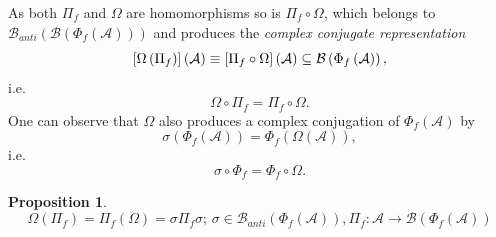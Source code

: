 \documentclass[aps,preprint]{revtex4}
\newtheorem{proposition}[theorem]{Proposition}
\begin{document}
As both $\Pi_{f}$ and $\Omega$ are homomorphisms so is $\Pi_{f}\circ\Omega$,
which belongs to $\mathcal{B}_{anti}\left( \mathcal{B}\left( \Phi_{f}\left( 
\mathcal{A}\right) \right) \right) $ and produces the \emph{complex
conjugate representation}%
\begin{equation}
\left[ \Omega\left( \Pi_{f}\right) \right] \left( \mathcal{A}\right) \equiv%
\left[ \Pi_{f}\circ\Omega\right] \left( \mathcal{A}\right) \subseteq\mathcal{%
B}\left( \Phi_{f}\left( \mathcal{A}\right) \right) ,
\end{equation}
i.e. 
\begin{equation}
\Omega\circ\Pi_{f}=\Pi_{f}\circ\Omega.
\end{equation}
One can observe that $\Omega$ also produces a complex conjugation of $\Phi
_{f}\left( \mathcal{A}\right) $ by 
\begin{equation}
\sigma\left( \Phi_{f}\left( \mathcal{A}\right) \right) =\Phi_{f}\left(
\Omega\left( \mathcal{A}\right) \right) ,
\end{equation}
i.e.%
\begin{equation}
\sigma\circ\Phi_{f}=\Phi_{f}\circ\Omega.
\end{equation}

\begin{proposition}
\begin{equation}
\Omega\left( \Pi_{f}\right) =\Pi_{f}\left( \Omega\right) =\sigma\Pi
_{f}\sigma;\,\sigma\in\mathcal{B}_{anti}\left( \Phi_{f}\left( \mathcal{A}%
\right) \right) ,\Pi_{f}:\mathcal{A}\rightarrow\mathcal{B}\left( \Phi
_{f}\left( \mathcal{A}\right) \right)
\end{equation}
\end{proposition}
\end{document}
